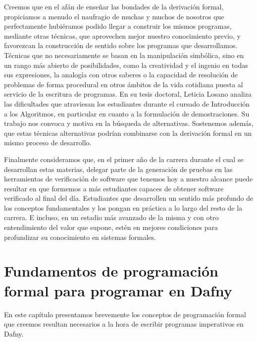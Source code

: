 \documentclass[12pt, a4paper, openany, fleqn]{book}
\begin{document}
    Creemos que en el afán de enseñar las bondades de la derivación formal, propiciamos a menudo el naufragio de muchas y muchos de nosotros que perfectamente hubiéramos podido llegar a construir los mismos programas, mediante otras técnicas, que aprovechen mejor nuestro conocimiento previo, y favorezcan la construcción de sentido sobre los programas que desarrollamos. Técnicas que no necesariamente se basan en la manipulación simbólica, sino en un rango más abierto de posibilidades, como la creatividad y el ingenio en todas sus expresiones, la analogía con otros saberes o la capacidad de resolución de problemas de forma procedural en otros ámbitos de la vida cotidiana puesta al servicio de la escritura de programas. En su tesis doctoral\cite{Losano}, Leticia Losano analiza las dificultades que atraviesan los estudiantes durante el cursado de Introducción a los Algoritmos, en particular en cuanto a la formulación de demostraciones. Su trabajo nos convoca y motiva en la búsqueda de alternativas. Sostenemos además, que estas técnicas alternativas podrían combinarse con la derivación formal en un mismo proceso de desarrollo.

    Finalmente consideramos que, en el primer año de la carrera durante el cual se desarrollan estas materias, delegar parte de la generación de pruebas en las herramientas de verificación de software que tenemos hoy a nuestro alcance puede resultar en que formemos a más estudiantes capaces de obtener software verificado al final del día. Estudiantes que desarrollen un sentido más profundo de los conceptos fundamentales y los pongan en práctica a lo largo del resto de la carrera. E incluso, en un estadio más avanzado de la misma y con otro entendimiento del valor que supone, estén en mejores condiciones para profundizar su conocimiento en sistemas formales.

    \chapter{Fundamentos de programación formal para programar en Dafny}
    En este capítulo presentamos brevemente los conceptos de programación formal que creemos resultan necesarios a la hora de escribir programas imperativos en Dafny.
\end{document}
